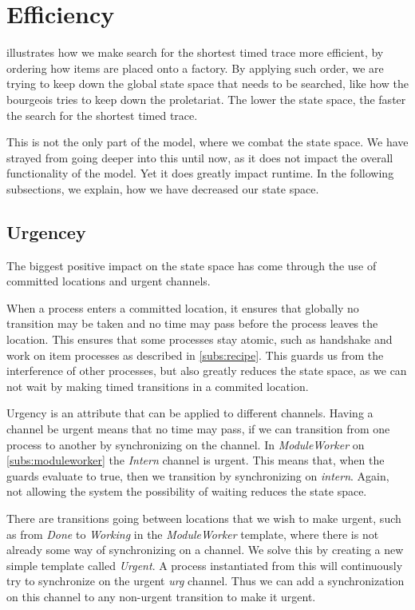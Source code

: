\section{Efficiency}\label{subs:efficiency}
 illustrates how we make search for the shortest timed trace more efficient, by ordering how items are placed onto a factory. By applying such order, we are trying to keep down the global state space that needs to be searched, like how the bourgeois tries to keep down the proletariat. The lower the state space, the faster the search for the shortest timed trace.

This is not the only part of the model, where we combat the state space. We have strayed from going deeper into this until now, as it does not impact the overall functionality of the model. Yet it does greatly impact runtime. In the following subsections, we explain, how we have decreased our state space. 

\subsection{Urgencey}
The biggest positive impact on the state space has come through the use of committed locations and urgent channels. 

When a process enters a committed location, it ensures that globally no transition may be taken and no time may pass before the process leaves the location. This ensures that some processes stay atomic, such as handshake and work on item processes as described in \cref{subs:recipe}. This guards us from the interference of other processes, but also greatly reduces the state space, as we can not wait by making timed transitions in a commited location.

Urgency is an attribute that can be applied to different channels. Having a channel be urgent means that no time may pass, if we can transition from one process to another by synchronizing on the channel. In \emph{ModuleWorker} on \cref{subs:moduleworker} the \textit{Intern} channel is urgent. This means that, when the guards evaluate to true, then we transition by synchronizing on \emph{intern}. Again, not allowing the system the possibility of waiting reduces the state space.

There are transitions going between locations that we wish to make urgent, such as from \emph{Done} to \emph{Working} in the \textit{ModuleWorker} template, where there is not already some way of synchronizing on a channel. We solve this by creating a new simple template called \emph{Urgent}. A process instantiated from this will continuously try to synchronize on the urgent \emph{urg} channel. Thus we can add a synchronization on this channel to any non-urgent transition to make it urgent. 

